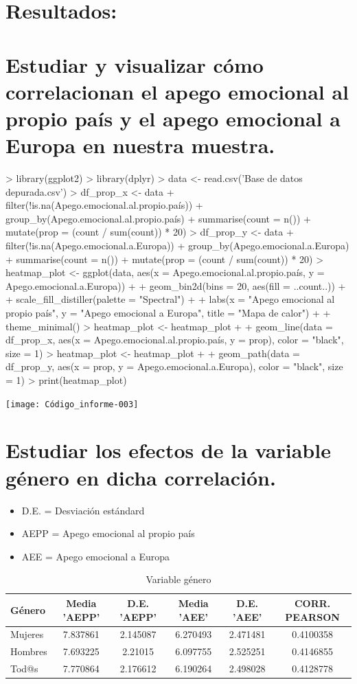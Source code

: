 \documentclass{article}
\begin{document}
\section*{Resultados:}

\section{Estudiar y visualizar cómo correlacionan el apego emocional al propio país y el apego emocional a Europa en nuestra muestra.}

\begin{Schunk}
\begin{Sinput}
> library(ggplot2)
> library(dplyr)
> data <- read.csv('Base de datos depurada.csv')
> df_prop_x <- data %
+   filter(!is.na(Apego.emocional.al.propio.país)) %
+   group_by(Apego.emocional.al.propio.país) %
+   summarise(count = n()) %
+   mutate(prop = (count / sum(count)) * 20)
> df_prop_y <- data %
+   filter(!is.na(Apego.emocional.a.Europa)) %
+   group_by(Apego.emocional.a.Europa) %
+   summarise(count = n()) %
+   mutate(prop = (count / sum(count)) * 20)
> heatmap_plot <- ggplot(data, aes(x = Apego.emocional.al.propio.país, y = Apego.emocional.a.Europa)) +
+   geom_bin2d(bins = 20, aes(fill = ..count..)) +
+   scale_fill_distiller(palette = "Spectral") +
+   labs(x = "Apego emocional al propio país", y = "Apego emocional a Europa", title = "Mapa de calor") +
+   theme_minimal()
> heatmap_plot <- heatmap_plot +
+   geom_line(data = df_prop_x, aes(x = Apego.emocional.al.propio.país, y = prop), color = "black", size = 1)
> heatmap_plot <- heatmap_plot +
+   geom_path(data = df_prop_y, aes(x = prop, y = Apego.emocional.a.Europa), color = "black", size = 1)
> print(heatmap_plot)
\end{Sinput}
\end{Schunk}
\texttt{[image: Código\_informe-003]}

\section{Estudiar los efectos de la variable género en dicha correlación.}
 \begin{itemize}
 \item D.E. = Desviación estándard
 \item AEPP = Apego emocional al propio país
 \item AEE = Apego emocional a Europa
 \end{itemize}
 \begin{table}[h!]
 \caption{Variable género}
 \begin{tabular}{l | c c c c c}
 \hline
 \bf{Género} & \bf{Media 'AEPP'} & \bf{D.E. 'AEPP'} & \bf{Media 'AEE'} & \bf{D.E. 'AEE'} & \bf{CORR. PEARSON} \\
 \hline
 Mujeres & 7.837861 & 2.145087 & 6.270493 & 2.471481 & 0.4100358 \\
 Hombres & 7.693225 & 2.21015 & 6.097755 & 2.525251 & 0.4146855 \\
 Tod@s & 7.770864 & 2.176612 & 6.190264 & 2.498028 & 0.4128778 \\
 \hline
 \end{tabular}
 \end{table}
\end{document}
